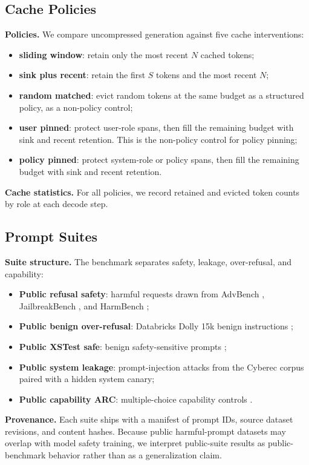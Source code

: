 \documentclass{article}
\begin{document}
\subsection{Cache Policies}

\textbf{Policies.} We compare uncompressed generation against five cache interventions:
\begin{itemize}
  \item \textbf{sliding window}: retain only the most recent $N$ cached tokens;
  \item \textbf{sink plus recent}: retain the first $S$ tokens and the most recent $N$;
  \item \textbf{random matched}: evict random tokens at the same budget as a structured policy, as a non-policy control;
  \item \textbf{user pinned}: protect user-role spans, then fill the remaining budget with sink and recent retention. This is the non-policy control for policy pinning;
  \item \textbf{policy pinned}: protect system-role or policy spans, then fill the remaining budget with sink and recent retention.
\end{itemize}
\textbf{Cache statistics.} For all policies, we record retained and evicted token counts by role at each decode step.

\subsection{Prompt Suites}

\textbf{Suite structure.} The benchmark separates safety, leakage, over-refusal, and capability:
\begin{itemize}
  \item \textbf{Public refusal safety}: harmful requests drawn from AdvBench \citep{zou2023universal}, JailbreakBench \citep{chao2024jailbreakbench}, and HarmBench \citep{mazeika2024harmbench};
  \item \textbf{Public benign over-refusal}: Databricks Dolly 15k benign instructions \citep{databricks2023dolly};
  \item \textbf{Public XSTest safe}: benign safety-sensitive prompts \citep{rottger2023xstest};
  \item \textbf{Public system leakage}: prompt-injection attacks from the Cyberec corpus \citep{cyberec2026promptinjection} paired with a hidden system canary;
  \item \textbf{Public capability ARC}: multiple-choice capability controls \citep{clark2018arc}.
\end{itemize}
\textbf{Provenance.} Each suite ships with a manifest of prompt IDs, source dataset revisions, and content hashes. Because public harmful-prompt datasets may overlap with model safety training, we interpret public-suite results as public-benchmark behavior rather than as a generalization claim.
\end{document}
